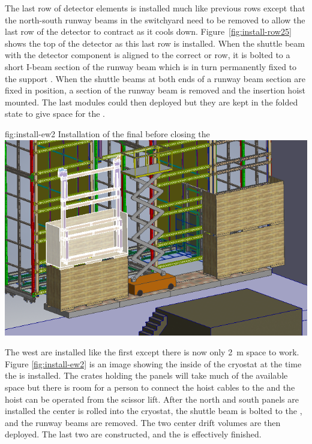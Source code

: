 The last row of detector elements is installed much like previous rows except that the north-south runway beams in the switchyard need to be removed to allow the last row of the detector to contract as it cools down.  Figure~\ref{fig:install-row25} shows the top of the detector as this last row is installed. When the shuttle beam with the detector component is aligned to the correct  or  row, it is bolted to a short I-beam section of the runway beam which is in turn permanently fixed to the  support \fdth . When the shuttle beams at both ends of a runway beam section are fixed in position, a section of the runway beam is removed and the  insertion hoist mounted. The last  modules could then deployed but they are kept in the folded state to give space for the . 



\begin{dunefigure}{fig:install-ew2}
  {Installation of the final  before closing the }
\includegraphics[width=.9\textwidth]{graphics/install-ew2.png}
\end{dunefigure}

The west  are installed like the first  except there is now only \SI{2}{m} space to work. Figure \ref{fig:install-ew2} is an image showing the inside of the cryostat at the time the  is installed. The crates holding the  panels will take much of the available space but there is room for a person to connect the hoist cables to the  and the hoist can be operated from the scissor lift. After the north and south  panels are installed the center  is rolled into the cryostat, the shuttle beam is bolted to the , and the runway beams are removed. The two center drift volumes  are then deployed. The last two  are constructed, and the  is effectively finished. 

